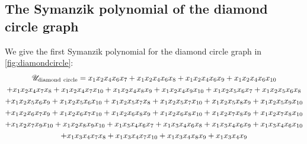 \documentclass[12pt,a4paper]{article}
\theoremstyle{plain}
\theoremstyle{remark}
\newcommand{\feynpar}{x}
\newcommand{\cU}{\mathscr {U}}
\begin{document}
\subsection{The Symanzik polynomial of the diamond circle  graph}\label{app:Udiamondcircle}
We give the first Symanzik polynomial for the diamond circle graph in \cref{fig:diamondcircle}:
 \begin{multline}\label{e:Udiamondcircle}
    \cU_{\rm diamond~circle}=\feynpar_{1} \feynpar_{2} \feynpar_{4} \feynpar_{6} \feynpar_{7}+\feynpar_{1} \feynpar_{2} \feynpar_{4}
    \feynpar_{6} \feynpar_{8}+\feynpar_{1} \feynpar_{2} \feynpar_{4} \feynpar_{6} \feynpar_{9}+\feynpar_{1} \feynpar_{2} \feynpar_{4} \feynpar_{6}
    \feynpar_{10}\cr
    +\feynpar_{1} \feynpar_{2} \feynpar_{4} \feynpar_{7} \feynpar_{8}+\feynpar_{1} \feynpar_{2} \feynpar_{4} \feynpar_{7}
    \feynpar_{10}+\feynpar_{1} \feynpar_{2} \feynpar_{4} \feynpar_{8} \feynpar_{9}+\feynpar_{1} \feynpar_{2} \feynpar_{4} \feynpar_{9}
    \feynpar_{10}+\feynpar_{1} \feynpar_{2} \feynpar_{5} \feynpar_{6} \feynpar_{7}+\feynpar_{1} \feynpar_{2} \feynpar_{5} \feynpar_{6}
    \feynpar_{8}\cr
    +\feynpar_{1} \feynpar_{2} \feynpar_{5} \feynpar_{6} \feynpar_{9}+\feynpar_{1} \feynpar_{2} \feynpar_{5} \feynpar_{6}
    \feynpar_{10}+\feynpar_{1} \feynpar_{2} \feynpar_{5} \feynpar_{7} \feynpar_{8}+\feynpar_{1} \feynpar_{2} \feynpar_{5} \feynpar_{7}
    \feynpar_{10}+\feynpar_{1} \feynpar_{2} \feynpar_{5} \feynpar_{8} \feynpar_{9}+\feynpar_{1} \feynpar_{2} \feynpar_{5} \feynpar_{9}
    \feynpar_{10}\cr
    +\feynpar_{1} \feynpar_{2} \feynpar_{6} \feynpar_{7} \feynpar_{9}+\feynpar_{1} \feynpar_{2} \feynpar_{6} \feynpar_{7}
    \feynpar_{10}+\feynpar_{1} \feynpar_{2} \feynpar_{6} \feynpar_{8} \feynpar_{9}+\feynpar_{1} \feynpar_{2} \feynpar_{6} \feynpar_{8}
    \feynpar_{10}+\feynpar_{1} \feynpar_{2} \feynpar_{7} \feynpar_{8} \feynpar_{9}+\feynpar_{1} \feynpar_{2} \feynpar_{7} \feynpar_{8}
    \feynpar_{10}\cr
    +\feynpar_{1} \feynpar_{2} \feynpar_{7} \feynpar_{9} \feynpar_{10}+\feynpar_{1} \feynpar_{2} \feynpar_{8} \feynpar_{9}
    \feynpar_{10}+\feynpar_{1} \feynpar_{3} \feynpar_{4} \feynpar_{6} \feynpar_{7}+\feynpar_{1} \feynpar_{3} \feynpar_{4} \feynpar_{6}
    \feynpar_{8}+\feynpar_{1} \feynpar_{3} \feynpar_{4} \feynpar_{6} \feynpar_{9}+\feynpar_{1} \feynpar_{3} \feynpar_{4} \feynpar_{6}
    \feynpar_{10}\cr
    +\feynpar_{1} \feynpar_{3} \feynpar_{4} \feynpar_{7} \feynpar_{8}+\feynpar_{1} \feynpar_{3} \feynpar_{4} \feynpar_{7}
    \feynpar_{10}+\feynpar_{1} \feynpar_{3} \feynpar_{4} \feynpar_{8} \feynpar_{9}+\feynpar_{1} \feynpar_{3} \feynpar_{4} \feynpar_{9}

\end{multline}
\end{document}
